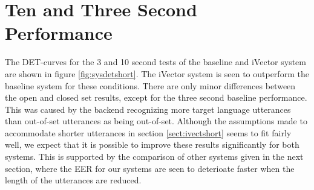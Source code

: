 

\section{Ten and Three Second Performance}


The DET-curves for the 3 and 10 second tests of the baseline and iVector system are shown in figure \ref{fig:sysdetshort}. The iVector system is seen to outperform the baseline system for these conditions.  There are only minor differences between the open and closed set results, except for the three second baseline performance. This was caused by the backend recognizing more target language utterances than out-of-set utterances as being out-of-set. Although the assumptions made to accommodate shorter utterances in section \ref{sect:ivectshort} seems to fit fairly well, we expect that it is possible to improve these results significantly for both systems. This is supported by the comparison of other systems given in the next section, where the EER for our systems are seen to deterioate faster when the length of the utterances are reduced.

